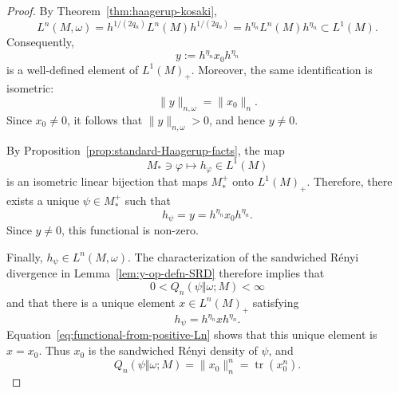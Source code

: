 \documentclass[11pt,a4paper]{article}
\theoremstyle{plain}
\numberwithin{theorem}{section}
\theoremstyle{definition}
\newcommand{\?}{\overset{?}{=}}
\DeclareMathOperator{\tr}{tr}
\begin{document}
\begin{proof}
By Theorem~\ref{thm:haagerup-kosaki},
\[
 L^n(M,\omega)
   =h^{1/(2q_n)}L^n(M)h^{1/(2q_n)}
   =h^{\eta_n}L^n(M)h^{\eta_n}
   \subset L^1(M).
\]
Consequently,
\[
    y:=h^{\eta_n}x_0h^{\eta_n}
\]
is a well-defined element of \(L^1(M)_+\). Moreover, the same
identification is isometric:
\[
    \|y\|_{n,\omega}=\|x_0\|_n.
\]
Since \(x_0\neq0\), it follows that \(\|y\|_{n,\omega}>0\), and
hence \(y\neq0\).

By Proposition~\ref{prop:standard-Haagerup-facts}, the map
\[
    M_*\ni\varphi\longmapsto h_\varphi\in L^1(M)
\]
is an isometric linear bijection that maps \(M_*^+\) onto
\(L^1(M)_+\). Therefore, there exists a unique
\(\psi\in M_*^+\) such that
\[
    h_\psi=y=h^{\eta_n}x_0h^{\eta_n}.
\]
Since \(y\neq0\), this functional is non-zero.

Finally, \(h_\psi\in L^n(M,\omega)\). The characterization of the
sandwiched R\'enyi divergence in Lemma~\ref{lem:y-op-defn-SRD} therefore
implies that
\[
    0<Q_n(\psi\Vert\omega;M)<\infty
\]
and that there is a unique element \(x\in L^n(M)_+\) satisfying
\[
    h_\psi=h^{\eta_n}xh^{\eta_n}.
\]
Equation~\eqref{eq:functional-from-positive-Ln} shows that this
unique element is \(x=x_0\). Thus \(x_0\) is the sandwiched Rényi
density of \(\psi\), and
\[
    Q_n(\psi\Vert\omega;M)
      =\|x_0\|_n^n
      =\tr(x_0^n).
\]
\end{proof}
\end{document}
